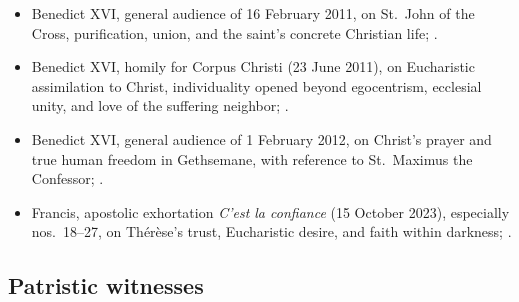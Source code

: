 {\begin{itemize}[itemsep=0pt,parsep=0pt,topsep=0.05em]
\item Benedict XVI, general audience of 16 February 2011, on St.~John of the Cross, purification, union, and the saint's concrete Christian life; .
\item Benedict XVI, homily for Corpus Christi (23 June 2011), on Eucharistic assimilation to Christ, individuality opened beyond egocentrism, ecclesial unity, and love of the suffering neighbor; .
\item Benedict XVI, general audience of 1 February 2012, on Christ's prayer and true human freedom in Gethsemane, with reference to St.~Maximus the Confessor; .
\item Francis, apostolic exhortation \emph{C'est la confiance} (15 October 2023), especially nos.~18--27, on Thérèse's trust, Eucharistic desire, and faith within darkness; .
\end{itemize}}

\subsection*{Patristic witnesses}


